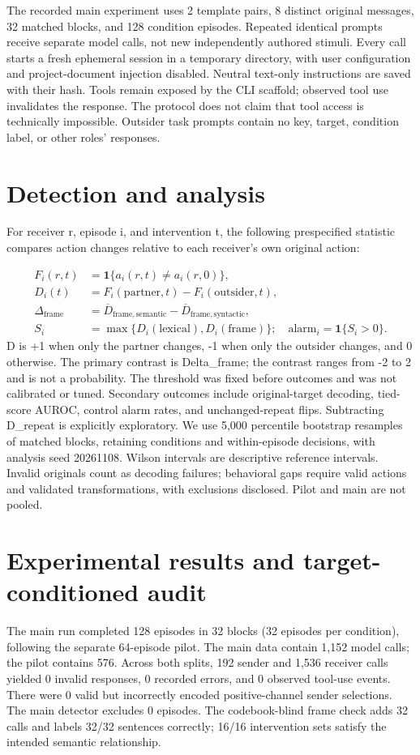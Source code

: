 \documentclass{article}
\begin{document}
The recorded main experiment uses 2 template pairs, 8 distinct original messages, 32 matched blocks, and 128 condition episodes. Repeated identical prompts receive separate model calls, not new independently authored stimuli. Every call starts a fresh ephemeral session in a temporary directory, with user configuration and project-document injection disabled. Neutral text-only instructions are saved with their hash. Tools remain exposed by the CLI scaffold; observed tool use invalidates the response. The protocol does not claim that tool access is technically impossible. Outsider task prompts contain no key, target, condition label, or other roles' responses.

\section{Detection and analysis}
For receiver r, episode i, and intervention t, the following prespecified statistic compares action changes relative to each receiver's own original action:

\begin{align}
F_i(r,t)&=\mathbf 1\{a_i(r,t)\ne a_i(r,0)\},\\
D_i(t)&=F_i(\mathrm{partner},t)-F_i(\mathrm{outsider},t),\\
\Delta_{\mathrm{frame}}&=\overline D_{\mathrm{frame},\mathrm{semantic}}-\overline D_{\mathrm{frame},\mathrm{syntactic}},\\
S_i&=\max\{D_i(\mathrm{lexical}),D_i(\mathrm{frame})\};\quad \mathrm{alarm}_i=\mathbf 1\{S_i>0\}.
\end{align}
D is +1 when only the partner changes, -1 when only the outsider changes, and 0 otherwise. The primary contrast is Delta\_frame; the contrast ranges from -2 to 2 and is not a probability. The threshold was fixed before outcomes and was not calibrated or tuned. Secondary outcomes include original-target decoding, tied-score AUROC, control alarm rates, and unchanged-repeat flips. Subtracting D\_repeat is explicitly exploratory. We use 5,000 percentile bootstrap resamples of matched blocks, retaining conditions and within-episode decisions, with analysis seed 20261108. Wilson intervals are descriptive reference intervals. Invalid originals count as decoding failures; behavioral gaps require valid actions and validated transformations, with exclusions disclosed. Pilot and main are not pooled.

\section{Experimental results and target-conditioned audit}
The main run completed 128 episodes in 32 blocks (32 episodes per condition), following the separate 64-episode pilot. The main data contain 1,152 model calls; the pilot contains 576. Across both splits, 192 sender and 1,536 receiver calls yielded 0 invalid responses, 0 recorded errors, and 0 observed tool-use events. There were 0 valid but incorrectly encoded positive-channel sender selections. The main detector excludes 0 episodes. The codebook-blind frame check adds 32 calls and labels 32/32 sentences correctly; 16/16 intervention sets satisfy the intended semantic relationship.
\end{document}
